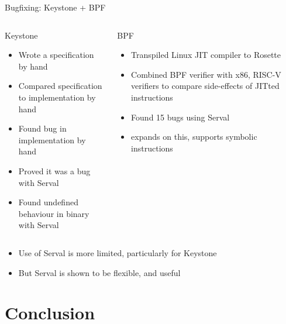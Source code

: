\documentclass[10pt,aspectratio=169]{beamer}
\newcommand{\twostack}[2]{
#1


\vfill\null


#2
}
\begin{document}
\begin{frame}{Bugfixing: Keystone + BPF}

\twostack{
    \begin{columns}[T]
\begin{block}{Keystone}
\begin{itemize}
    \item Wrote a specification by hand
    \item Compared specification to implementation by hand
    \item Found bug in implementation by hand
    \item Proved it was a bug with Serval
    \item Found undefined behaviour in binary with Serval
\end{itemize}
\end{block}

\column{0.5\textwidth}
\begin{block}{BPF}
\begin{itemize}
\item Transpiled Linux JIT compiler to Rosette
\item Combined BPF verifier with x86, RISC-V verifiers to compare side-effects of JITted instructions
\item Found 15 bugs using Serval
\item \cite{nelsonSpecificationVerificationField2020} expands on this, supports symbolic instructions
\end{itemize}
\end{block}
\end{columns}
}{
\begin{itemize}
    \item {Use of Serval is more limited, particularly for Keystone}
    \item {But Serval is shown to be flexible, and useful}
\end{itemize}
}
\end{frame}

\section{Conclusion}
\end{document}
